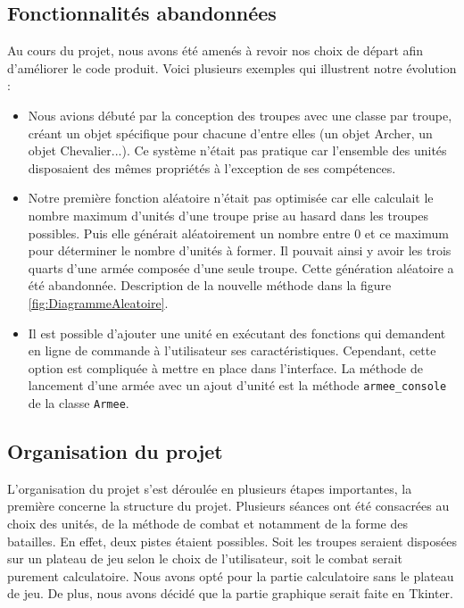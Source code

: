 \documentclass[a4paper]{article} %
\begin{document}
	\subsection{Fonctionnalités abandonnées}
Au cours du projet, nous avons été amenés à revoir nos choix de départ afin d'améliorer le code produit. Voici plusieurs exemples qui illustrent notre évolution : 
\begin{itemize}
	\item Nous avions débuté par la conception des troupes avec une classe par troupe, créant un objet spécifique pour chacune d'entre elles (un objet Archer, un objet Chevalier...). Ce système n'était pas pratique car l'ensemble des unités disposaient des mêmes propriétés à l’exception de ses compétences.
	\item Notre première fonction aléatoire n'était pas optimisée car elle calculait le nombre maximum d'unités d'une troupe prise au hasard dans les troupes possibles. Puis elle générait aléatoirement un nombre entre 0 et ce maximum pour déterminer le nombre d'unités à former. Il pouvait ainsi y avoir les trois quarts d'une armée composée d'une seule troupe. Cette génération aléatoire a été abandonnée. Description de la nouvelle méthode dans la figure \ref{fig:DiagrammeAleatoire}.
	\item Il est possible d'ajouter une unité en exécutant des fonctions qui demandent en ligne de commande à l'utilisateur ses caractéristiques. Cependant, cette option est compliquée à mettre en place dans l'interface. La méthode de lancement d'une armée avec un ajout d'unité est la méthode \texttt{armee\_console} de la classe \texttt{Armee}.
\end{itemize}

	\subsection{Organisation du projet}
L'organisation du projet s'est déroulée en plusieurs étapes importantes, la première concerne la structure du projet. Plusieurs séances ont été consacrées au choix des unités, de la méthode de combat et notamment de la forme des batailles. En effet, deux pistes étaient possibles. Soit les troupes seraient disposées sur un plateau de jeu selon le choix de l'utilisateur, soit le combat serait purement calculatoire. Nous avons opté pour la partie calculatoire sans le plateau de jeu. De plus, nous avons décidé que la partie graphique serait faite en Tkinter.\\
\end{document}
